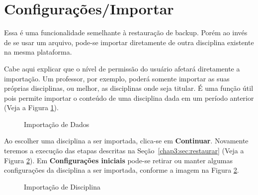\section{Configurações/Importar}
Essa é uma funcionalidade semelhante à restauração de backup. Porém ao invés de se usar um arquivo, pode-se importar diretamente de outra disciplina existente na mesma plataforma.

Cabe aqui explicar que o nível de permissão do usuário afetará diretamente a importação. Um professor, por exemplo,  poderá somente importar as suas próprias disciplinas, ou melhor, as disciplinas onde seja titular. É uma função útil pois permite importar o conteúdo de uma disciplina dada em um período anterior (Veja a Figura \ref{Fig: cap3_20}).

\begin{figure}[htbp]
 \begin{center}
  \caption{Importação de Dados}
  \label{Fig: cap3_20}
 \end{center}
\end{figure}

Ao escolher uma disciplina a ser importada, clica-se em \textbf{Continuar}. Novamente teremos a execução das etapas descritas na Seção~\ref{chap3:sec:restaurar} (Veja a Figura \ref{Fig: cap3_21}).
Em \textbf{Configurações iniciais} pode-se retirar ou manter algumas configurações da disciplina a ser importada, conforme a imagem 
na Figura \ref{Fig: cap3_21}.

\begin{figure}[htbp]
 \begin{center}
  \caption{Importação de Disciplina}
  \label{Fig: cap3_21}
 \end{center}
\end{figure}



